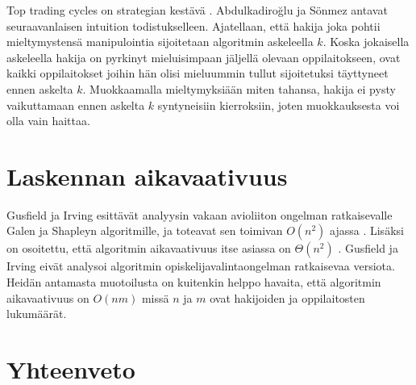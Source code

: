 \documentclass[gradu, twoside]{tktltiki}
\begin{document}
Top trading cycles on strategian kestävä \cite{abdusön03}.
Abdulkadiroğlu ja Sönmez antavat seuraavanlaisen intuition
todistukselleen. Ajatellaan, että hakija joka pohtii mieltymystensä
manipulointia sijoitetaan algoritmin askeleella $k$. Koska jokaisella
askeleella hakija on pyrkinyt mieluisimpaan jäljellä olevaan
oppilaitokseen, ovat kaikki oppilaitokset joihin hän olisi mieluummin
tullut sijoitetuksi täyttyneet ennen askelta $k$. Muokkaamalla
mieltymyksiään miten tahansa, hakija ei pysty vaikuttamaan ennen
askelta $k$ syntyneisiin kierroksiin, joten muokkauksesta voi olla
vain haittaa.

\section{Laskennan aikavaativuus}

Gusfield ja Irving esittävät analyysin vakaan avioliiton ongelman
ratkaisevalle Galen ja Shapleyn algoritmille, ja toteavat sen toimivan
$O(n^2)$ ajassa \cite{gusfield89}. Lisäksi on osoitettu, että
algoritmin aikavaativuus itse asiassa on $\Theta(n^2)$ \cite{cheng89}.
Gusfield ja Irving eivät analysoi algoritmin opiskelijavalintaongelman
ratkaisevaa versiota. Heidän antamasta muotoilusta on kuitenkin helppo
havaita, että algoritmin aikavaativuus on $O(nm)$ missä $n$ ja $m$
ovat hakijoiden ja oppilaitosten lukumäärät.

\section{Yhteenveto}
\end{document}
